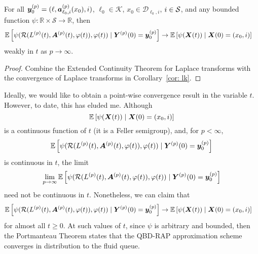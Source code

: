 \begin{thm}\label{thm: big thm}
	For all \(\boldsymbol y_0^{(p)}=(\ell,\boldsymbol a_{\ell_0,i}^{(p)}(x_0),i)\), \(\ell_0\in\mathcal K\), \(x_0\in\mathcal D_{\ell_0,i}\), \(i\in\mathcal{S}\), and any bounded function \(\psi:\mathbb R\times \mathcal S \to \mathbb R\), then
	\begin{align}
			&\mathbb E\left[\psi( \mathcal R(L^{(p)}(t),\boldsymbol A^{(p)}(t),\varphi(t)),\varphi(t) )   \mid \boldsymbol Y^{(p)}(0)=\boldsymbol y_0^{(p)} \right] \nonumber 
			\to \mathbb E\left[\psi({\boldsymbol X}(t))\mid \boldsymbol X(0)=(x_0, i) \right] \nonumber
	\end{align}
	weakly in \(t\) as \(p\to \infty\). 
\end{thm}
\begin{proof}
	Combine the Extended Continuity Theorem for Laplace transforms \cite[Chapter XIII, Theorem 2a]{feller1957} with the convergence of Laplace transforms in Corollary~\ref{cor: lk}. 
\end{proof}

Ideally, we would like to obtain a point-wise convergence result in the variable \(t\). However, to date, this has eluded me. Although 
\[\mathbb E\left[\psi({\boldsymbol X}(t))\mid \boldsymbol X(0)=(x_0,i) \right]\] 
is a continuous function of \(t\) (it is a Feller semigroup), and, for \(p<\infty\), 
\[\mathbb E\left[\psi( \mathcal R(L^{(p)}(t),\boldsymbol A^{(p)}(t),\varphi(t)),\varphi(t) )   \mid \boldsymbol Y^{(p)}(0)=\boldsymbol y_0^{(p)} \right]  \]
 is continuous in \(t\), the limit 
 \[\lim\limits_{p\to\infty}\mathbb E\left[\psi( \mathcal R(L^{(p)}(t),\boldsymbol A^{(p)}(t),\varphi(t)),\varphi(t) ) \mid \boldsymbol Y^{(p)}(0)=\boldsymbol y_0^{(p)}\right]  \] need not be continuous in \(t\). Nonetheless, we can claim that 
\begin{align}
		&\mathbb E\left[\psi( \mathcal R(L^{(p)}(t),\boldsymbol A^{(p)}(t),\varphi(t)),\varphi(t) )    \mid \boldsymbol Y^{(p)}(0)=\boldsymbol y_0^{(p)}\right]  \nonumber
		\to \mathbb E\left[\psi({\boldsymbol X}(t) )\mid \boldsymbol X(0)=(x_0, i) \right] \nonumber
\end{align}
for almost all \(t\geq 0\). At such values of \(t\), since \(\psi\) is arbitrary and bounded, then the Portmanteau Theorem \citep[Theorem 2.1]{billingsleyconvergence} states that the QBD-RAP approximation scheme converges in distribution to the fluid queue.

